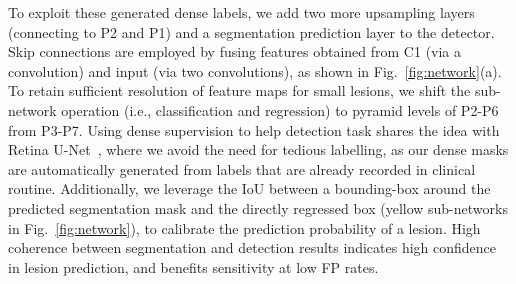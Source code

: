 \documentclass[runningheads,a4paper]{llncs}
\begin{document}
To exploit these generated dense labels, we add two more upsampling layers (connecting to P2 and P1) and a segmentation prediction layer to the detector.
Skip connections are employed by fusing features obtained from C1 (via a   convolution) and input (via two  convolutions), as shown in Fig.~\ref{fig:network}(a).
To retain sufficient resolution of feature maps for small lesions, we shift the sub-network operation (i.e., classification and regression) to pyramid levels of P2-P6 from P3-P7.
Using dense supervision to help detection task shares the idea with Retina U-Net~\cite{jaeger2018retina}, where we avoid the need for tedious labelling, as our dense masks are automatically generated from labels that are already recorded in clinical routine.
Additionally, we leverage the IoU between a bounding-box around the predicted segmentation mask and the directly regressed box (yellow sub-networks in Fig.~\ref{fig:network}), to calibrate the prediction probability  of a lesion.
High coherence between segmentation and detection results indicates high confidence in lesion prediction, and benefits sensitivity at low FP rates.





\begin{comment}
In order to retain the feature map resolution for the small lesions,
we attach the classification and regression sub-networks to P2-P6 convolutional layers, rather than P3-P7 used in the original RetinaNet. This also allows us to increase the previously optimised scales from 0.425, 0.54, 0.68 to 0.85, 1.08 and 1.36 (doubling the scales).
We employ focal loss for the dense supervision.
The use of the pixel-wise mask is to provide regularisation to the model by providing inductive bias of the lesion location, rather than to obtain a perfect segmentation prediction for the lesion.
\end{comment}

\begin{comment}
The performance was further improved by adding the semantic segmentation output based on Retina U-Net \cite{jaeger2018retina}. Even though the aim is not to achieve very accurate semantic segmentation the per pixel supervision signals improve the sensitivity of the model. The newly added convolutions in the feature pyramid network were connected to the backbone using a  convolutional layer except for the connection between the input and the the top-most convolution where two  convolutions were used.
\end{comment}
\end{document}
